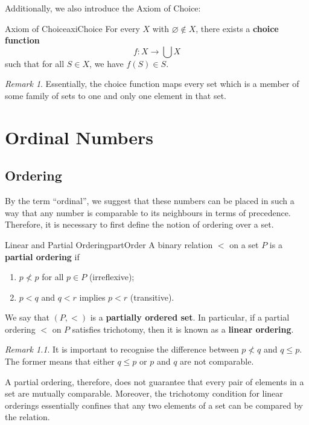 \documentclass[math]{amznotes}
\theoremstyle{remark}
\newtheorem*{remark}{Remark}
\begin{document}
Additionally, we also introduce the Axiom of Choice:
\begin{axibox}{Axiom of Choice}{axiChoice}
    For every $X$ with $\varnothing \notin X$, there exists a {\color{red} \textbf{choice function}}
    \begin{displaymath}
        f \colon X \to \bigcup X
    \end{displaymath}
    such that for all $S \in X$, we have $f(S) \in S$.
\end{axibox}
\begin{notebox}
    \begin{remark}
        Essentially, the choice function maps every set which is a member of some family of sets to one and only one element in that set.
    \end{remark}
\end{notebox}

\chapter{Ordinal Numbers}
\section{Ordering}
By the term ``ordinal'', we suggest that these numbers can be placed in such a way that any number is comparable to its neighbours in terms of precedence. Therefore, it is necessary to first define the notion of ordering over a set.
\begin{dfnbox}{Linear and Partial Ordering}{partOrder}
    A binary relation $<$ on a set $P$ is a {\color{red} \textbf{partial ordering}} if 
    \begin{enumerate}
        \item $p \not < p$ for all $p \in P$ (irreflexive);
        \item $p < q$ and $q < r$ implies $p < r$ (transitive).
    \end{enumerate}
    We say that $(P, <)$ is a {\color{red} \textbf{partially ordered set}}. In particular, if a partial ordering $<$ on $P$ satisfies trichotomy, then it is known as a {\color{red} \textbf{linear ordering}}.
\end{dfnbox}
\begin{notebox}
    \begin{remark}
        It is important to recognise the difference between $p \not < q$ and $q \leq p$. The former means that either $q \leq p$ or $p$ and $q$ are not comparable.
    \end{remark}
\end{notebox}
A partial ordering, therefore, does not guarantee that every pair of elements in a set are mutually comparable. Moreover, the trichotomy condition for linear orderings essentially confines that any two elements of a set can be compared by the relation.
\end{document}
